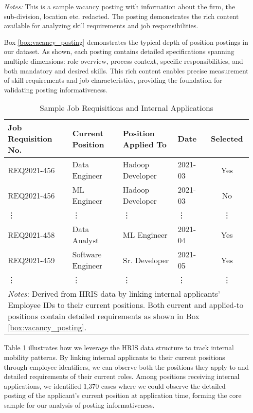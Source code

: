 \noindent \textit{Notes:} This is a sample vacancy posting with information about the firm, the sub-division, location etc. redacted. The posting demonstrates the rich content available for analyzing skill requirements and job responsibilities. 

Box \ref{box:vacancy_posting} demonstrates the typical depth of position postings in our dataset. As shown, each posting contains detailed specifications spanning multiple dimensions: role overview, process context, specific responsibilities, and both mandatory and desired skills. This rich content enables precise measurement of skill requirements and job characteristics, providing the foundation for validating posting informativeness.

\begin{table}[t]
    \caption{Sample Job Requisitions and Internal Applications}
    \begin{tabular*}{\textwidth}{@{\extracolsep\fill}llllc}
    \toprule
    Job Requisition No. & Current Position & Position Applied To & Date & Selected \\
    \midrule
    REQ2021-456 & Data Engineer & Hadoop Developer & 2021-03 & Yes \\
    REQ2021-456 & ML Engineer & Hadoop Developer & 2021-03 & No \\
    \vdots & \vdots & \vdots & \vdots & \vdots \\
    REQ2021-458 & Data Analyst & ML Engineer & 2021-04 & Yes \\
    REQ2021-459 & Software Engineer & Sr. Developer & 2021-05 & Yes \\
    \vdots & \vdots & \vdots & \vdots & \vdots \\
    \bottomrule
    \multicolumn{5}{p{\textwidth}}{\footnotesize \textit{Notes:} Derived from HRIS data by linking internal applicants' Employee IDs to their current positions. Both current and applied-to positions contain detailed requirements as shown in Box \ref{box:vacancy_posting}.} \\
    \end{tabular*}
    \label{tab:requisitions}
\end{table}

Table \ref{tab:requisitions} illustrates how we leverage the HRIS data structure to track internal mobility patterns. By linking internal applicants to their current positions through employee identifiers, we can observe both the positions they apply to and detailed requirements of their current roles. Among positions receiving internal applications, we identified 1,370 cases where we could observe the detailed posting of the applicant's current position at application time, forming the core sample for our analysis of posting informativeness.

